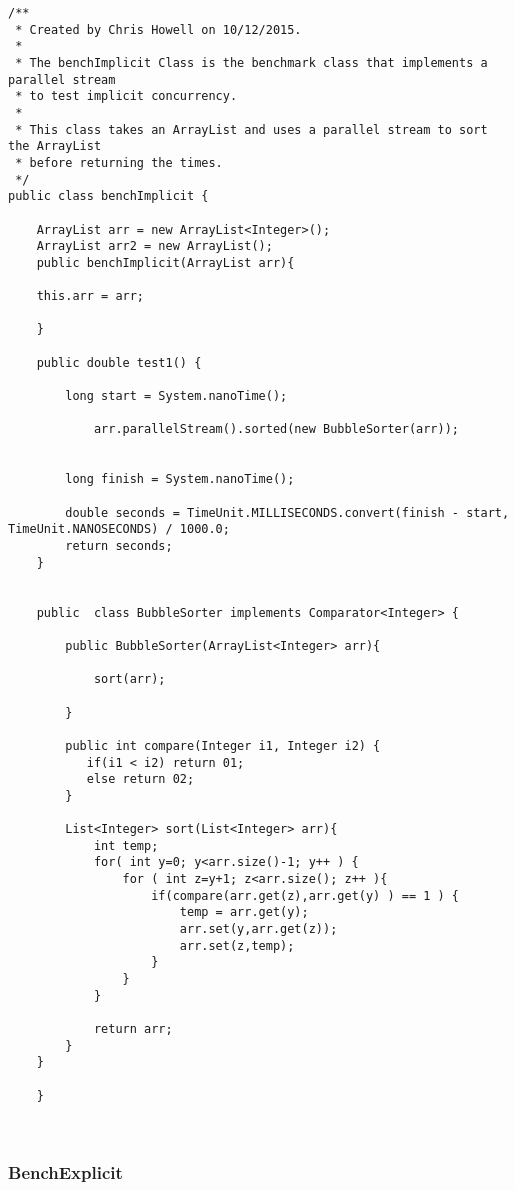 \documentclass[11pt]{article}  %
\theoremstyle{definition}
\theoremstyle{remark}
\begin{document}
\begin{appendices}
\begin{lstlisting}
/**
 * Created by Chris Howell on 10/12/2015.
 *
 * The benchImplicit Class is the benchmark class that implements a parallel stream
 * to test implicit concurrency.
 *
 * This class takes an ArrayList and uses a parallel stream to sort the ArrayList
 * before returning the times.
 */
public class benchImplicit {

    ArrayList arr = new ArrayList<Integer>();
    ArrayList arr2 = new ArrayList();
    public benchImplicit(ArrayList arr){

    this.arr = arr;

    }

    public double test1() {

        long start = System.nanoTime();

            arr.parallelStream().sorted(new BubbleSorter(arr));


        long finish = System.nanoTime();

        double seconds = TimeUnit.MILLISECONDS.convert(finish - start, TimeUnit.NANOSECONDS) / 1000.0;
        return seconds;
    }


    public  class BubbleSorter implements Comparator<Integer> {

        public BubbleSorter(ArrayList<Integer> arr){

            sort(arr);

        }

        public int compare(Integer i1, Integer i2) {
           if(i1 < i2) return 01;
           else return 02;
        }

        List<Integer> sort(List<Integer> arr){
            int temp;
            for( int y=0; y<arr.size()-1; y++ ) {
                for ( int z=y+1; z<arr.size(); z++ ){
                    if(compare(arr.get(z),arr.get(y) ) == 1 ) {
                        temp = arr.get(y);
                        arr.set(y,arr.get(z));
                        arr.set(z,temp);
                    }
                }
            }

            return arr;
        }
    }

    }



\end{lstlisting}

\newpage
\subsubsection{BenchExplicit}\label{1} 
  \begin{lstlisting}


\end{lstlisting}
\end{appendices}
\end{document}
